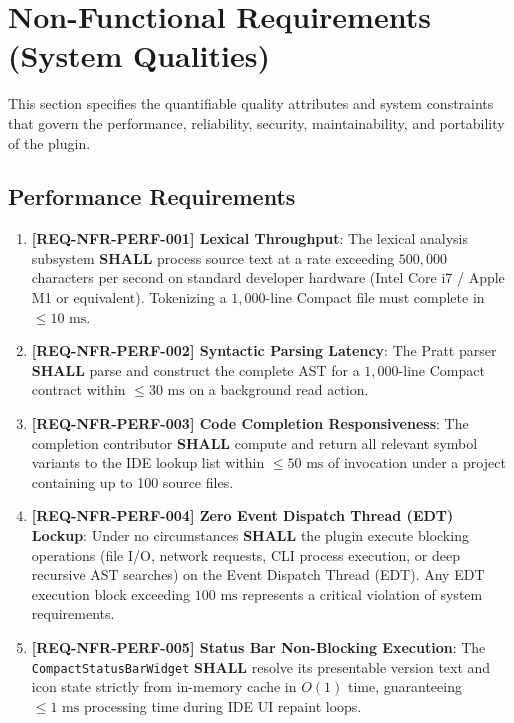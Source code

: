 \section{Non-Functional Requirements (System Qualities)}
\label{sec:nonfunctional}

This section specifies the quantifiable quality attributes and system constraints that govern the performance, reliability, security, maintainability, and portability of the plugin.

\subsection{Performance Requirements}
\label{sec:perf_requirements}

\begin{enumerate}
    \item \textbf{[REQ-NFR-PERF-001] Lexical Throughput}:
    The lexical analysis subsystem \textbf{SHALL} process source text at a rate exceeding $500{,}000$ characters per second on standard developer hardware (Intel Core i7 / Apple M1 or equivalent). Tokenizing a $1{,}000$-line Compact file must complete in $\le 10\text{ ms}$.
    
    \item \textbf{[REQ-NFR-PERF-002] Syntactic Parsing Latency}:
    The Pratt parser \textbf{SHALL} parse and construct the complete AST for a $1{,}000$-line Compact contract within $\le 30\text{ ms}$ on a background read action.
    
    \item \textbf{[REQ-NFR-PERF-003] Code Completion Responsiveness}:
    The completion contributor \textbf{SHALL} compute and return all relevant symbol variants to the IDE lookup list within $\le 50\text{ ms}$ of invocation under a project containing up to 100 source files.
    
    \item \textbf{[REQ-NFR-PERF-004] Zero Event Dispatch Thread (EDT) Lockup}:
    Under no circumstances \textbf{SHALL} the plugin execute blocking operations (file I/O, network requests, CLI process execution, or deep recursive AST searches) on the Event Dispatch Thread (EDT). Any EDT execution block exceeding $100\text{ ms}$ represents a critical violation of system requirements.
    
    \item \textbf{[REQ-NFR-PERF-005] Status Bar Non-Blocking Execution}:
    The \texttt{CompactStatusBarWidget} \textbf{SHALL} resolve its presentable version text and icon state strictly from in-memory cache in $O(1)$ time, guaranteeing $\le 1\text{ ms}$ processing time during IDE UI repaint loops.
\end{enumerate}

